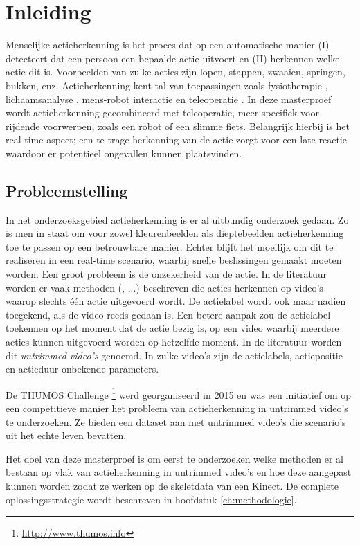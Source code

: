 \setcounter{page}{1}
\chapter{Inleiding}
\label{ch:Inleiding}
Menselijke actieherkenning is het proces dat op een automatische manier (I) detecteert dat een persoon een bepaalde actie uitvoert en (II) herkennen welke actie dit is. Voorbeelden van zulke acties zijn lopen, stappen, zwaaien, springen, bukken, enz. Actieherkenning kent tal van toepassingen zoals fysiotherapie \cite{Deboeverie2016}, lichaamsanalyse \cite{Devi2015}, mens-robot interactie \cite{Li2018} en teleoperatie \cite{Ajili2017}. In deze masterproef wordt actieherkenning gecombineerd met teleoperatie, meer specifiek voor rijdende voorwerpen, zoals een robot of een slimme fiets. Belangrijk hierbij is het real-time aspect; een te trage herkenning van de actie zorgt voor een late reactie waardoor er potentieel ongevallen kunnen plaatsvinden. 

\section{Probleemstelling}
In het onderzoeksgebied actieherkenning is er al uitbundig onderzoek gedaan. Zo is men in staat om voor zowel kleurenbeelden als dieptebeelden actieherkenning toe te passen op een betrouwbare manier. Echter blijft het moeilijk om dit te realiseren in een real-time scenario, waarbij snelle beslissingen gemaakt moeten worden. Een groot probleem is de onzekerheid van de actie. In de literatuur worden er vaak methoden (\cite{Xia2012}, ...) beschreven die acties herkennen op video's waarop slechts één actie uitgevoerd wordt. De actielabel wordt ook maar nadien toegekend, als de video reeds gedaan is. Een betere aanpak zou de actielabel toekennen op het moment dat de actie bezig is, op een video waarbij meerdere acties kunnen uitgevoerd worden op hetzelfde moment. In de literatuur worden dit \textit{untrimmed video's} genoemd. In zulke video's zijn de actielabels, actiepositie en actieduur onbekende parameters.

De THUMOS Challenge \footnote{\url{http://www.thumos.info}} werd georganiseerd in 2015 en was een initiatief om op een competitieve manier het probleem van actieherkenning in untrimmed video's te onderzoeken. Ze bieden een dataset aan met untrimmed video's die scenario's uit het echte leven bevatten.

Het doel van deze masterproef is om eerst te onderzoeken welke methoden er al bestaan op vlak van actieherkenning in untrimmed video's en hoe deze aangepast kunnen worden zodat ze werken op de skeletdata van een Kinect. De complete oplossingsstrategie wordt beschreven in hoofdstuk \ref{ch:methodologie}.



